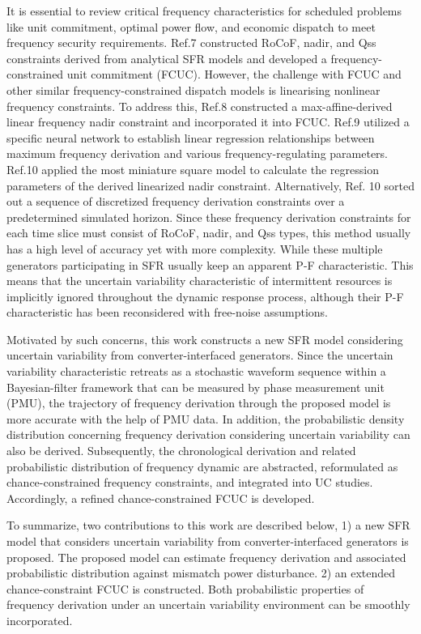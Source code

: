 \documentclass[lettersize,journal]{IEEEtran}
\begin{document}
It is essential to review critical frequency characteristics for scheduled problems like unit commitment, optimal power flow, and economic dispatch to meet frequency security requirements. Ref.7 constructed RoCoF, nadir, and Qss constraints derived from analytical SFR models and developed a frequency-constrained unit commitment (FCUC). However, the challenge with FCUC and other similar frequency-constrained dispatch models is linearising nonlinear frequency constraints. To address this, Ref.8 constructed a max-affine-derived linear frequency nadir constraint and incorporated it into FCUC. Ref.9 utilized a specific neural network to establish linear regression relationships between maximum frequency derivation and various frequency-regulating parameters. Ref.10 applied the most miniature square model to calculate the regression parameters of the derived linearized nadir constraint. Alternatively, Ref. 10 sorted out a sequence of discretized frequency derivation constraints over a predetermined simulated horizon. Since these frequency derivation constraints for each time slice must consist of RoCoF, nadir, and Qss types, this method usually has a high level of accuracy yet with more complexity. While these multiple generators participating in SFR usually keep an apparent P-F characteristic. This means that the uncertain variability characteristic of intermittent resources is implicitly ignored throughout the dynamic response process, although their P-F characteristic has been reconsidered with free-noise assumptions.

Motivated by such concerns, this work constructs a new SFR model considering uncertain variability from converter-interfaced generators. Since the uncertain variability characteristic retreats as a stochastic waveform sequence within a Bayesian-filter framework that can be measured by phase measurement unit (PMU), the trajectory of frequency derivation through the proposed model is more accurate with the help of PMU data. In addition, the probabilistic density distribution concerning frequency derivation considering uncertain variability can also be derived. Subsequently, the chronological derivation and related probabilistic distribution of frequency dynamic are abstracted, reformulated as chance-constrained frequency constraints, and integrated into UC studies. Accordingly, a refined chance-constrained FCUC is developed.

To summarize, two contributions to this work are described below,
1) a new SFR model that considers uncertain variability from converter-interfaced generators is proposed. The proposed model can estimate frequency derivation and associated probabilistic distribution against mismatch power disturbance.
2) an extended chance-constraint FCUC is constructed. Both probabilistic properties of frequency derivation under an uncertain variability environment can be smoothly incorporated.
\end{document}

